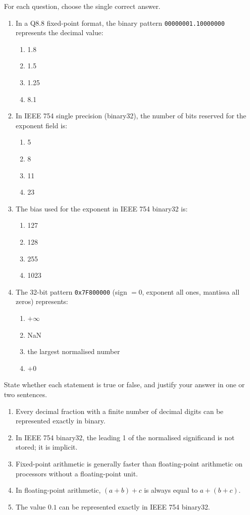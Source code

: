 \documentclass[11pt]{article}
\newcounter{popsec}
\newcounter{popsub}
\newcommand{\courssub}[1]{%
  \stepcounter{popsub}%
  \par\vspace{9pt}\noindent{\popxbold\fontsize{11.5}{13}\selectfont\color{popink}{\color{poporange}\thepopsec.\thepopsub}\hspace{6pt}#1}\par\nopagebreak\vspace{4pt}
}
\begin{document}
\courssub{I check my knowledge}

\begin{exercice}
For each question, choose the single correct answer.
\begin{enumerate}
\item In a Q8.8 fixed-point format, the binary pattern \texttt{00000001.10000000} represents the decimal value:
\begin{enumerate}
\item 1.8 \quad \item 1.5 \quad \item 1.25 \quad \item 8.1
\end{enumerate}
\item In IEEE 754 single precision (binary32), the number of bits reserved for the exponent field is:
\begin{enumerate}
\item 5 \quad \item 8 \quad \item 11 \quad \item 23
\end{enumerate}
\item The bias used for the exponent in IEEE 754 binary32 is:
\begin{enumerate}
\item 127 \quad \item 128 \quad \item 255 \quad \item 1023
\end{enumerate}
\item The 32-bit pattern \texttt{0x7F800000} (sign $=0$, exponent all ones, mantissa all zeros) represents:
\begin{enumerate}
\item $+\infty$ \quad \item NaN \quad \item the largest normalised number \quad \item $+0$
\end{enumerate}
\end{enumerate}
\end{exercice}

\begin{exercice}
State whether each statement is true or false, and justify your answer in one or two sentences.
\begin{enumerate}
\item Every decimal fraction with a finite number of decimal digits can be represented exactly in binary.
\item In IEEE 754 binary32, the leading 1 of the normalised significand is not stored; it is implicit.
\item Fixed-point arithmetic is generally faster than floating-point arithmetic on processors without a floating-point unit.
\item In floating-point arithmetic, $(a+b)+c$ is always equal to $a+(b+c)$.
\item The value $0.1$ can be represented exactly in IEEE 754 binary32.
\end{enumerate}
\end{exercice}
\end{document}
